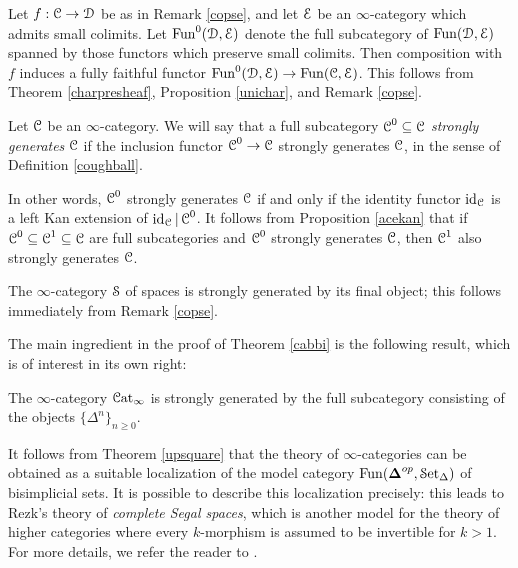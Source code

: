 \begin{remark}\label{copo}
Let $f: \operatorname{\mathcal{C}} \rightarrow \operatorname{\mathcal{D}}$ be as in Remark \ref{copse}, and let $\operatorname{\mathcal{E}}$ be an $\infty$-category which admits small colimits. Let $\operatorname{Fun}^{0}(\operatorname{\mathcal{D}}, \operatorname{\mathcal{E}})$ denote the full subcategory of
$\operatorname{Fun}(\operatorname{\mathcal{D}}, \operatorname{\mathcal{E}})$ spanned by those functors which preserve small colimits. Then composition
with $f$ induces a fully faithful functor $\operatorname{Fun}^{0}(\operatorname{\mathcal{D}}, \operatorname{\mathcal{E}}) \rightarrow \operatorname{Fun}(\operatorname{\mathcal{C}}, \operatorname{\mathcal{E}})$. 
This follows from Theorem \ref{charpresheaf}, Proposition \ref{unichar}, and Remark \ref{copse}.
\end{remark}

\begin{definition}\label{ballcough}
Let $\operatorname{\mathcal{C}}$ be an $\infty$-category. We will say that a full subcategory $\operatorname{\mathcal{C}}^{0} \subseteq \operatorname{\mathcal{C}}$ 
{\it strongly generates} $\operatorname{\mathcal{C}}$ if the inclusion functor $\operatorname{\mathcal{C}}^{0} \rightarrow \operatorname{\mathcal{C}}$ strongly generates $\operatorname{\mathcal{C}}$, in the sense of Definition \ref{coughball}.
\end{definition}

\begin{remark}\label{sobre}
In other words, $\operatorname{\mathcal{C}}^0$ strongly generates $\operatorname{\mathcal{C}}$ if and only if the identity functor
$\operatorname{id}_{\operatorname{\mathcal{C}}}$ is a left Kan extension of $\operatorname{id}_{\operatorname{\mathcal{C}}} | \operatorname{\mathcal{C}}^{0}$. It follows from Proposition \ref{acekan} that if $\operatorname{\mathcal{C}}^{0} \subseteq \operatorname{\mathcal{C}}^{1} \subseteq \operatorname{\mathcal{C}}$ are full subcategories and
$\operatorname{\mathcal{C}}^{0}$ strongly generates $\operatorname{\mathcal{C}}$, then $\operatorname{\mathcal{C}}^{1}$ also strongly generates $\operatorname{\mathcal{C}}$.
\end{remark}

\begin{example}
The $\infty$-category $\operatorname{\mathcal{S}}$ of spaces is strongly generated by its final object;
this follows immediately from Remark \ref{copse}.
\end{example}

The main ingredient in the proof of Theorem \ref{cabbi} is the following result, which is of interest in its own right:

\begin{theorem}\label{upsquare}
The $\infty$-category $\operatorname{\mathcal{C}at}_{\infty}$ is strongly generated by the full subcategory consisting of the objects $\{ \Delta^n \}_{n \geq 0}$. 
\end{theorem}

\begin{remark}
It follows from Theorem \ref{upsquare} that the theory of $\infty$-categories can be obtained as a suitable localization of the model category $\operatorname{Fun}( \operatorname{{\bf \Delta}}^{op}, \operatorname{\mathcal{S}et_{\Delta}})$ of bisimplicial sets. It is possible to describe this localization precisely: this leads to Rezk's theory of {\em complete Segal spaces}, which is another model for the theory of higher categories where every $k$-morphism is assumed to be invertible for $k > 1$. For more details, we refer the reader to \cite{completesegal}.
\end{remark}

